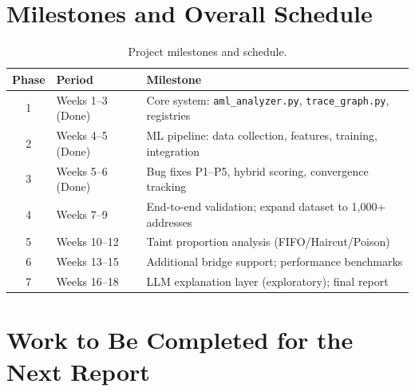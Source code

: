 \documentclass[12pt,a4paper]{article}
\begin{document}
\section{Milestones and Overall Schedule}

\begin{table}[htbp]
\centering
\caption{Project milestones and schedule.}
\label{tab:milestones}
\small
\begin{tabular}{clp{8cm}}
\toprule
\textbf{Phase} & \textbf{Period} & \textbf{Milestone} \\
\midrule
1 & Weeks 1--3 (Done)  & Core system: \texttt{aml\_analyzer.py}, \texttt{trace\_graph.py}, registries \\
2 & Weeks 4--5 (Done)  & ML pipeline: data collection, features, training, integration \\
3 & Weeks 5--6 (Done)  & Bug fixes P1--P5, hybrid scoring, convergence tracking \\
4 & Weeks 7--9         & End-to-end validation; expand dataset to 1,000+ addresses \\
5 & Weeks 10--12       & Taint proportion analysis (FIFO/Haircut/Poison) \\
6 & Weeks 13--15       & Additional bridge support; performance benchmarks \\
7 & Weeks 16--18       & LLM explanation layer (exploratory); final report \\
\bottomrule
\end{tabular}
\end{table}


\section{Work to Be Completed for the Next Report}
\end{document}
